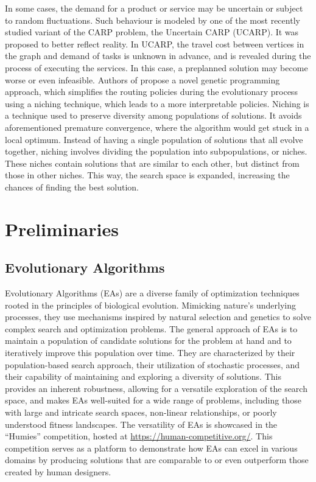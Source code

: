 \documentclass[twoside]{ctuthesis}
\theoremstyle{plain}
\theoremstyle{definition}
\theoremstyle{note}
\begin{document}
In some cases, the demand for a product or service may be uncertain or subject to random fluctuations. Such behaviour is modeled by one of the most recently studied variant of the CARP problem, the Uncertain CARP (UCARP). It was proposed to better reflect reality. In UCARP, the travel cost between vertices in the graph and demand of tasks is unknown in advance, and is revealed during the process of executing the services. In this case, a preplanned solution may become worse or even infeasible. Authors of \cite{wang2021genetic} propose a novel genetic programming approach, which simplifies the routing policies during the evolutionary process using a niching technique, which leads to a more interpretable policies. Niching is a technique used to preserve diversity among populations of solutions. It avoids aforementioned premature convergence, where the algorithm would get stuck in a local optimum. Instead of having a single population of solutions that all evolve together, niching involves dividing the population into subpopulations, or niches. These niches contain solutions that are similar to each other, but distinct from those in other niches. This way, the search space is expanded, increasing the chances of finding the best solution.


\chapter{Preliminaries}


\section{Evolutionary Algorithms}
\label{sec:evolutionbasic}

Evolutionary Algorithms (EAs) are a diverse family of optimization techniques rooted in the principles of biological evolution. Mimicking nature's underlying processes, they use mechanisms inspired by natural selection and genetics to solve complex search and optimization problems. The general approach of EAs is to maintain a population of candidate solutions for the problem at hand and to iteratively improve this population over time. They are characterized by their population-based search approach, their utilization of stochastic processes, and their capability of maintaining and exploring a diversity of solutions. This provides an inherent robustness, allowing for a versatile exploration of the search space, and makes EAs well-suited for a wide range of problems, including those with large and intricate search spaces, non-linear relationships, or poorly understood fitness landscapes. The versatility of EAs is showcased in the ``Humies'' competition, hosted at \url{https://human-competitive.org/}. This competition serves as a platform to demonstrate how EAs can excel in various domains by producing solutions that are comparable to or even outperform those created by human designers.
\end{document}

